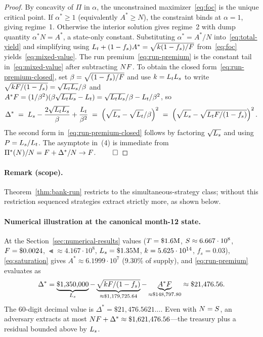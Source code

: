 \begin{proof}
By concavity of $\Pi$ in $\alpha$, the unconstrained maximizer~\eqref{eq:foc} is the unique critical point. If $\alpha^* \geq 1$ (equivalently $A^* \geq N$), the constraint binds at $\alpha = 1$, giving regime~1. Otherwise the interior solution gives regime~2 with dump quantity $\alpha^* N = A^*$, a state-only constant. Substituting $\alpha^* = A^*/N$ into~\eqref{eq:total-yield} and simplifying using $L_t + (1 - f_s) A^* = \sqrt{k (1 - f_s)/F}$ from~\eqref{eq:foc} yields~\eqref{eq:mixed-value}. The run premium~\eqref{eq:run-premium} is the constant tail in~\eqref{eq:mixed-value} after subtracting $N F$. To obtain the closed form~\eqref{eq:run-premium-closed}, set $\beta = \sqrt{(1-f_s)/F}$ and use $k = L_t L_s$ to write $\sqrt{k F/(1-f_s)} = \sqrt{L_t L_s}/\beta$ and $A^* F = (1/\beta^2)(\beta \sqrt{L_t L_s} - L_t) = \sqrt{L_tL_s}/\beta - L_t/\beta^2$, so
\[
\Delta^* \;=\; L_s - \frac{2\sqrt{L_t L_s}}{\beta} + \frac{L_t}{\beta^2} \;=\; \left(\sqrt{L_s} - \sqrt{L_t}/\beta\right)^2 \;=\; \left(\sqrt{L_s} - \sqrt{L_tF/(1-f_s)}\right)^2.
\]
The second form in~\eqref{eq:run-premium-closed} follows by factoring $\sqrt{L_s}$ and using $P = L_s/L_t$. The asymptote in~(4) is immediate from $\Pi^*(N)/N = F + \Delta^*/N \to F$. $\qed$
\end{proof}

\paragraph{Remark (scope).} Theorem~\ref{thm:bank-run} restricts to the simultaneous-strategy class; without this restriction sequenced strategies extract strictly more, as shown below.

\paragraph{Numerical illustration at the canonical month-12 state.} At the Section~\ref{sec:numerical-results} values ($T = \$1.6\text{M}$, $S \approx 6.667 \cdot 10^8$, $F = \$0.0024$, $\Lt \approx 4.167 \cdot 10^8$, $L_s = \$1.35\text{M}$, $k = 5.625 \cdot 10^{14}$, $f_s = 0.03$), \eqref{eq:saturation} gives $A^* \approx 6.1999 \cdot 10^7$ ($9.30\%$ of supply), and \eqref{eq:run-premium} evaluates as
\[
\Delta^* = \underbrace{\$1{,}350{,}000}_{L_s} - \underbrace{\sqrt{k F/(1-f_s)}}_{\approx \$1{,}179{,}725.64} - \underbrace{A^* F}_{\approx \$148{,}797.80} \approx \$21{,}476.56.
\]
The 60-digit decimal value is $\Delta^* = \$21{,}476.5621\ldots$. Even with $N = S$, an adversary extracts at most $NF + \Delta^* \approx \$1{,}621{,}476.56$---the treasury plus a residual bounded above by $L_s$.

